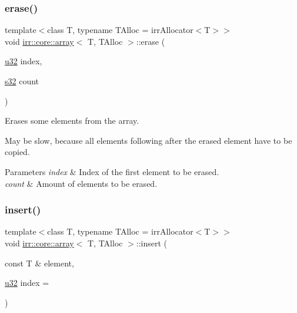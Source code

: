 \subsubsection{\texorpdfstring{erase()}{erase()}\hspace{0.1cm}{\footnotesize\ttfamily [4/4]}}
{\footnotesize\ttfamily template$<$class T, typename T\+Alloc = irr\+Allocator$<$\+T$>$$>$ \\
void \hyperlink{classirr_1_1core_1_1array}{irr\+::core\+::array}$<$ T, T\+Alloc $>$\+::erase (\begin{DoxyParamCaption}\item[{\hyperlink{namespaceirr_a0416a53257075833e7002efd0a18e804}{u32}}]{index,  }\item[{\hyperlink{namespaceirr_ac66849b7a6ed16e30ebede579f9b47c6}{s32}}]{count }\end{DoxyParamCaption})\hspace{0.3cm}{\ttfamily [inline]}}



Erases some elements from the array. 

May be slow, because all elements following after the erased element have to be copied. 
\begin{DoxyParams}{Parameters}
{\em index} & Index of the first element to be erased. \\
\hline
{\em count} & Amount of elements to be erased. \\
\hline
\end{DoxyParams}
\mbox{\label{classirr_1_1core_1_1array_a3b0f73c95dd449a4de576c6b1943566c}} 
\subsubsection{\texorpdfstring{insert()}{insert()}\hspace{0.1cm}{\footnotesize\ttfamily [1/2]}}
{\footnotesize\ttfamily template$<$class T, typename T\+Alloc = irr\+Allocator$<$\+T$>$$>$ \\
void \hyperlink{classirr_1_1core_1_1array}{irr\+::core\+::array}$<$ T, T\+Alloc $>$\+::insert (\begin{DoxyParamCaption}\item[{const T \&}]{element,  }\item[{\hyperlink{namespaceirr_a0416a53257075833e7002efd0a18e804}{u32}}]{index = {} }\end{DoxyParamCaption})\hspace{0.3cm}{\ttfamily [inline]}}



